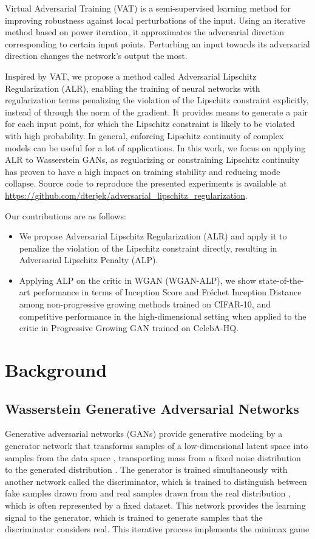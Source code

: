 \documentclass{article}
\begin{document}
Virtual Adversarial Training (VAT) \citep{Miyatoetal2017} is a semi-supervised learning method for improving robustness against local perturbations of the input. Using an iterative method based on power iteration, it approximates the adversarial direction corresponding to certain input points. Perturbing an input towards its adversarial direction changes the network's output the most.

Inspired by VAT, we propose a method called Adversarial Lipschitz Regularization (ALR), enabling the training of neural networks with regularization terms penalizing the violation of the Lipschitz constraint explicitly, instead of through the norm of the gradient. It provides means to generate a pair for each input point, for which the Lipschitz constraint is likely to be violated with high probability. In general, enforcing Lipschitz continuity of complex models can be useful for a lot of applications. In this work, we focus on applying ALR to Wasserstein GANs, as regularizing or constraining Lipschitz continuity has proven to have a high impact on training stability and reducing mode collapse. Source code to reproduce the presented experiments is available at \href{https://github.com/dterjek/adversarial_lipschitz_regularization}{https://github.com/dterjek/adversarial\_lipschitz\_regularization}.

Our contributions are as follows:

\begin{itemize}
\item We propose Adversarial Lipschitz Regularization (ALR) and apply it to penalize the violation of the Lipschitz constraint directly, resulting in Adversarial Lipschitz Penalty (ALP).
\item Applying ALP on the critic in WGAN (WGAN-ALP), we show state-of-the-art performance in terms of Inception Score and Fr\'echet Inception Distance among non-progressive growing methods trained on CIFAR-10, and competitive performance in the high-dimensional setting when applied to the critic in Progressive Growing GAN trained on CelebA-HQ.
\end{itemize}

\section{Background}
\label{background}
\subsection{Wasserstein Generative Adversarial Networks}
Generative adversarial networks (GANs) provide generative modeling by a generator network  that transforms samples of a low-dimensional latent space  into samples from the data space , transporting mass from a fixed noise distribution  to the generated distribution . The generator is trained simultaneously with another network  called the discriminator, which is trained to distinguish between fake samples drawn from  and real samples drawn from the real distribution , which is often represented by a fixed dataset. This network provides the learning signal to the generator, which is trained to generate samples that the discriminator considers real. This iterative process implements the minimax game
\end{document}
